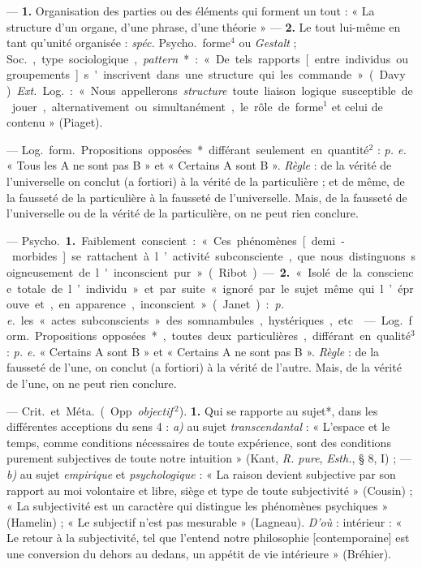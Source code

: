 \begin{itemize}[leftmargin=1cm, label=, itemsep=1pt]
 — {\bf 1.}  Organisation des parties ou des
éléments qui forment un tout : « La structure d’un organe, d'une phrase,
d’une théorie » —  {\bf 2.}  Le tout lui-même en tant qu'unité
organisée : {\it spéc.} \si{Psycho.} forme$^4$ ou {\it Gestalt} ; \si{Soc.},
type sociologique, {\it pattern}* : « De tels rapports [entre individus ou
groupements] s'inscrivent dans une structure qui les commande » (Davy).
{\it Ext.} \si{Log.} : « Nous appellerons {\it structure} toute liaison
logique susceptible de jouer, alternativement ou simultanément, le rôle de
forme$^1$ et celui de contenu » (Piaget).

 — \si{Log.} \si{form.} Propositions opposées*
différant seulement en quantité$^2$ : {\it p. e.} « Tous les A ne sont pas B
» et « Certains A sont B ». {\it Règle} : de la vérité de l’universelle on
conclut (a fortiori) à la vérité de la particulière ;
et de même, de la fausseté de la particulière à la fausseté de l’universelle.
Mais, de la fausseté de l’universelle ou de la vérité de la particulière, on
ne peut rien conclure.

 — \si{Psycho.} {\bf 1.} Faiblement conscient : « Ces
phénomènes [demi-morbides] se rattachent à l’activité subconsciente, que nous
distinguons soigneusement de l'inconscient pur » (Ribot). — {\bf 2.} « Isolé
de la conscience totale de l’individu » et par suite « ignoré par le sujet
même qui l’éprouve et, en apparence, inconscient » (Janet) : {\it p. e.} les
« actes subconscients » des somnambules, hystériques, etc.

 — \si{Log.} \si{form.} Propositions
opposées*, toutes deux particulières, différant en qualité$^3$ : {\it p. e.}
« Certains A sont B » et « Certains A ne sont pas B ». {\it Règle} : de la
fausseté de l’une, on conclut (a fortiori) à la vérité de l’autre. Mais, de
la vérité de l’une, on ne peut rien conclure.

 — \si{Crit.} et \si{Méta.} (Opp. {\it objectif}$\,^2$). {\bf 1.}
Qui se rapporte au sujet*, dans les différentes acceptions du sens 4 :
{\it a)} au sujet {\it transcendantal} : « L'espace et le temps, comme
conditions nécessaires de toute expérience, sont des conditions purement
subjectives de toute notre intuition » (Kant, {\it R. pure}, {\it Esth.}, §
8, I) ; — {\it b)} au sujet {\it empirique} et {\it psychologique} : « La
raison devient subjective par son rapport au moi volontaire et libre, siège
et type de toute subjectivité » (Cousin) ; « La subjectivité est un caractère
qui distingue les phénomènes psychiques » (Hamelin) ; « Le subjectif n’est
pas mesurable » (Lagneau). {\it D'où} : intérieur : « Le retour
à la subjectivité, tel que l'entend notre philosophie [contemporaine] est une
conversion du dehors au dedans, un appétit de vie intérieure » (Bréhier).


\end{itemize}

